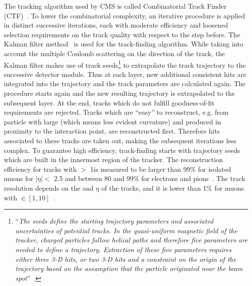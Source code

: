 The tracking algorithm used by CMS is called Combinatorial Track Finder (CTF)~\cite{Collaboration_2014_tracking}.
To lower the combinatorial complexity, an iterative
procedure is applied in distinct successive iterations, each with moderate
efficiency and loosened selection requirements on the track quality with
respect to the step before. The Kalman
filter method~\cite{BILLOIR1990219} is used for the track-finding
algorithm. While taking into account the multiple Coulomb scattering on the
direction of the track, the Kalman filter makes use of track
seeds\footnote{``\emph{The seeds define the starting trajectory parameters and associated uncertainties of potential
tracks. In the quasi-uniform magnetic field of the tracker, charged particles follow helical paths
and therefore five parameters are needed to define a trajectory. Extraction of these five parameters
requires either three 3-D hits, or two 3-D hits and a constraint on the origin of the trajectory
based on the assumption that the particle originated near the beam
spot}''~\cite{Collaboration_2014_tracking}.} 
to extrapolate the track
trajectory to the successive detector module. Thus at each layer, new
additional consistent hits
are integrated into the trajectory and the track parameters are
calculated again. The procedure starts again and the new resulting
trajectory is extrapolated to the subsequent layer. At the end, tracks
which do not fulfill goodness-of-fit requirements are rejected. Tracks
which are ``easy'' to reconstruct, e.g. from particle with large \pt
(which means less evident curvature) and produced in proximity to the
interaction point, are reconstructed first. Therefore hits associated
to these tracks are taken out, making the subsequent iterations less
complex. To guarantee high efficiency, track-finding starts with
trajectory seeds which are built in the innermost region of the
tracker. 
The reconstruction efficiency for tracks with \pt $>$ 1\GeV  is measured to be larger
than 99\% for isolated muons for $|\eta| < $ 2.5 and between 80 and
99\% for electrons and pions~\cite{CMS:particleflow}. The track \pt
resolution depends on the \pt and $\eta$ of the tracks, and it is
lower than 1\% for muons with \pt $\in [1,10]$\GeV~\cite{CMS:particleflow}.\\

